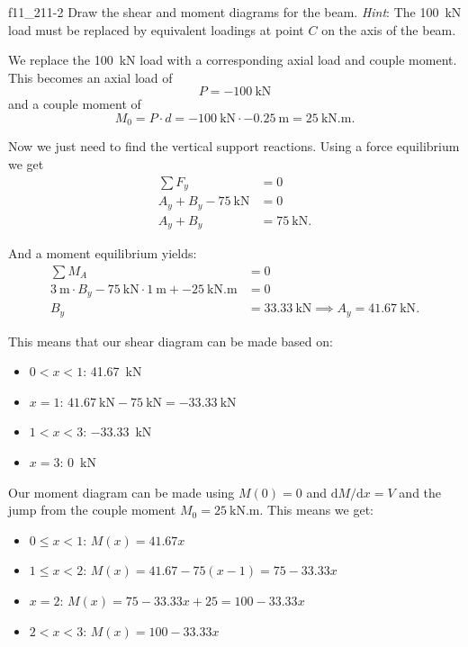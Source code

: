 
\begin{problemwithimage}{f11_2}{11-2}
  Draw the shear and moment diagrams for the beam.
  \textit{Hint}: The \qty{100}{\kN} load must be replaced by equivalent loadings at point $C$ on the axis of the beam.
\end{problemwithimage}

\begin{derivation}
  We replace the \qty{100}{\kN} load with a corresponding axial load and couple moment.
  This becomes an axial load of
  \begin{equation*}
    P = -\qty{100}{\kN} 
  \end{equation*}
  and a couple moment of
  \begin{equation*}
    M_0 = P \cdot d = \qty{-100}{\kN} \cdot \qty{-0.25}{\m} = \qty{25}{\kN.\m} 
  .\end{equation*}

  Now we just need to find the vertical support reactions.
  Using a force equilibrium we get
  \begin{align*}
    \sum F_y &= 0 \\
    A_y + B_y - \qty{75}{\kN} &= 0 \\
    A_y + B_y &= \qty{75}{\kN} 
  .\end{align*}
  
  And a moment equilibrium yields:
  \begin{align*}
    \sum M_A &= 0 \\
    \qty{3}{\m} \cdot B_y - \qty{75}{\kN} \cdot \qty{1}{\m} + \qty{-25}{\kN.\m} &= 0 \\
    B_y &= \qty{33,33}{\kN} \implies A_y = \qty{41.67}{\kN} 
  .\end{align*}

  This means that our shear diagram can be made based on:
  \begin{itemize}
    \item $0<x<1$: \qty{41,67}{\kN} 
    \item $x = 1$: $\qty{41.67}{\kN} - \qty{75}{\kN} = \qty{-33,33}{\kN}$
    \item $1 < x < 3$: \qty{-33,33}{\kN}
    \item $x = 3$: \qty{0}{\kN} 
  \end{itemize}

  Our moment diagram can be made using $M(0) = 0$ and $\mathrm{d}M / \mathrm{d}x = V$ and the jump from the couple moment $M_0 = \qty{25}{\kN.\m}$.
  This means we get:
  \begin{itemize}
    \item $0 \leq x <  1$: $M(x) = 41.67 x$
    \item $1 \leq x < 2$: $M(x) = 41.67 - 75 (x-1) = 75 - 33.33 x$
    \item $x = 2$: $M(x) = 75 - 33.33 x + 25 = 100 - 33.33 x$
    \item $2 < x < 3$: $M(x) = 100 - 33.33 x$
  \end{itemize}


\end{derivation}
